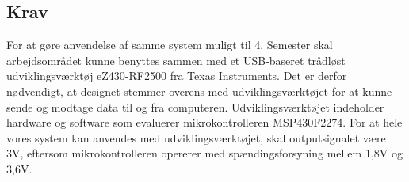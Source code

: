 \subsection{Krav}
For at gøre anvendelse af samme system muligt til 4. Semester skal arbejdsområdet kunne benyttes sammen med et USB-baseret trådløst udviklingsværktøj eZ430-RF2500 fra Texas Instruments. Det er derfor nødvendigt, at designet stemmer overens med udviklingsværktøjet for at kunne sende og modtage data til og fra computeren. Udviklingsværktøjet indeholder hardware og software som evaluerer mikrokontrolleren MSP430F2274. For at hele vores system kan anvendes med udviklingsværktøjet, skal outputsignalet være 3V, eftersom mikrokontrolleren opererer med spændingsforsyning mellem 1,8V og 3,6V.

%
%
%
%
%
%


